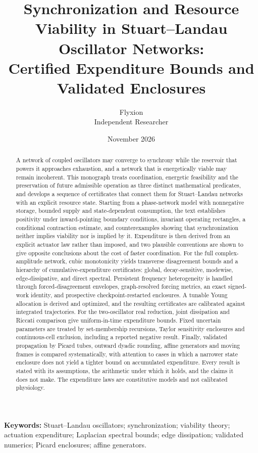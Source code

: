 \documentclass[11pt,notitlepage]{report}
\title{Synchronization and Resource Viability in Stuart--Landau Oscillator Networks:\\[0.4ex]
\large Certified Expenditure Bounds and Validated Enclosures}
\author{Flyxion\\Independent Researcher}
\date{November 2026}
\theoremstyle{definition}
\theoremstyle{remark}
\begin{document}
\maketitle
\begin{abstract}
\noindent A network of coupled oscillators may converge to synchrony while the reservoir that powers it approaches exhaustion, and a network that is energetically viable may remain incoherent. This monograph treats coordination, energetic feasibility and the preservation of future admissible operation as three distinct mathematical predicates, and develops a sequence of certificates that connect them for Stuart--Landau networks with an explicit resource state. Starting from a phase-network model with nonnegative storage, bounded supply and state-dependent consumption, the text establishes positivity under inward-pointing boundary conditions, invariant operating rectangles, a conditional contraction estimate, and counterexamples showing that synchronization neither implies viability nor is implied by it. Expenditure is then derived from an explicit actuator law rather than imposed, and two plausible conventions are shown to give opposite conclusions about the cost of faster coordination. For the full complex-amplitude network, cubic monotonicity yields transverse disagreement bounds and a hierarchy of cumulative-expenditure certificates: global, decay-sensitive, modewise, edge-dissipative, and direct spectral. Persistent frequency heterogeneity is handled through forced-disagreement envelopes, graph-resolved forcing metrics, an exact signed-work identity, and prospective checkpoint-restarted enclosures. A tunable Young allocation is derived and optimized, and the resulting certificates are calibrated against integrated trajectories. For the two-oscillator real reduction, joint dissipation and Riccati comparison give uniform-in-time expenditure bounds. Fixed uncertain parameters are treated by set-membership recursions, Taylor sensitivity enclosures and continuous-cell exclusion, including a reported negative result. Finally, validated propagation by Picard tubes, outward dyadic rounding, affine generators and moving frames is compared systematically, with attention to cases in which a narrower state enclosure does not yield a tighter bound on accumulated expenditure. Every result is stated with its assumptions, the arithmetic under which it holds, and the claims it does not make. The expenditure laws are constitutive models and not calibrated physiology.
\end{abstract}
\par\bigskip\noindent\textbf{Keywords:} Stuart--Landau oscillators; synchronization; viability theory; actuation expenditure; Laplacian spectral bounds; edge dissipation; validated numerics; Picard enclosures; affine generators.
\clearpage
\tableofcontents
\clearpage
\end{document}
